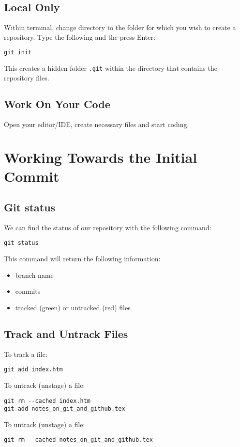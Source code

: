 \documentclass[12pt]{article}
\begin{document}
\subsection*{Local Only}
Within terminal, change directory to the folder for which you wish to create a repository. Type the following and the press Enter:
\begin{Verbatim}
git init
\end{Verbatim}
This creates a hidden folder \verb|.git| within the directory that contains the repository files.

\subsection*{Work On Your Code}
Open your editor/IDE, create necessary files and start coding.






\newpage





\section{Working Towards the Initial Commit}
\subsection*{Git status}
We can find the status of our repository with the following command:
\begin{Verbatim}
git status
\end{Verbatim}
This command will return the following information:
\begin{itemize}[nosep]
\item branch name
\item commits
\item tracked (green) or untracked (red) files
\end{itemize}

\subsection*{Track and Untrack Files}
To track a file:
\begin{Verbatim}
git add index.htm
\end{Verbatim}
To untrack (unstage) a file:
\begin{Verbatim}
git rm --cached index.htm
git add notes_on_git_and_github.tex
\end{Verbatim}
To untrack (unstage) a file:
\begin{Verbatim}
git rm --cached notes_on_git_and_github.tex
\end{Verbatim}
\end{document}
